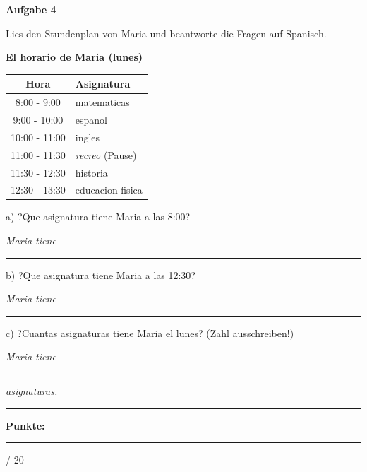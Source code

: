 \documentclass[11pt, a4paper]{article}
\newcommand{\fachfarbe}{spanisch}
\newcommand{\maxpunkte}{20}
\newcommand{\punktebox}[1]{\hfill\fbox{\small \_/#1}}
\newcommand{\luecke}[1]{\rule{#1}{0.4pt}}
\newenvironment{aufgabe}[1]{%
    \needspace{5\baselineskip}%
    \nopagebreak[4]%
    \vspace{10pt}
    \noindent\textbf{\textcolor{\fachfarbe}{Aufgabe #1}}
    \nopagebreak[4]%
    \vspace{5pt}
    \nopagebreak[4]%
    \begin{list}{}{\leftmargin=0pt}
    \item[]
}{%
    \end{list}
}
\begin{document}
\begin{aufgabe}{4}
Lies den Stundenplan von Maria und beantworte die Fragen auf Spanisch. \punktebox{6}
\end{aufgabe}

\begin{center}
\textbf{El horario de Maria (lunes)}

\vspace{0.5em}

\begin{tabular}{|c|l|}
\hline
\textbf{Hora} & \textbf{Asignatura} \\
\hline
8:00 - 9:00 & matematicas \\
\hline
9:00 - 10:00 & espanol \\
\hline
10:00 - 11:00 & ingles \\
\hline
11:00 - 11:30 & \textit{recreo} (Pause) \\
\hline
11:30 - 12:30 & historia \\
\hline
12:30 - 13:30 & educacion fisica \\
\hline
\end{tabular}
\end{center}

\vspace{0.8em}

\noindent
a) ?Que asignatura tiene Maria a las 8:00?

\vspace{0.3em}
\noindent
\textit{Maria tiene} \luecke{6cm}

\vspace{0.8em}

\noindent
b) ?Que asignatura tiene Maria a las 12:30?

\vspace{0.3em}
\noindent
\textit{Maria tiene} \luecke{6cm}

\vspace{0.8em}

\noindent
c) ?Cuantas asignaturas tiene Maria el lunes? (Zahl ausschreiben!)

\vspace{0.3em}
\noindent
\textit{Maria tiene} \luecke{4cm} \textit{asignaturas.}


\vspace{20pt}
\hrule
\vspace{10pt}

\begin{flushright}
\textbf{Punkte:} \luecke{1cm} / \maxpunkte
\end{flushright}
\end{document}
